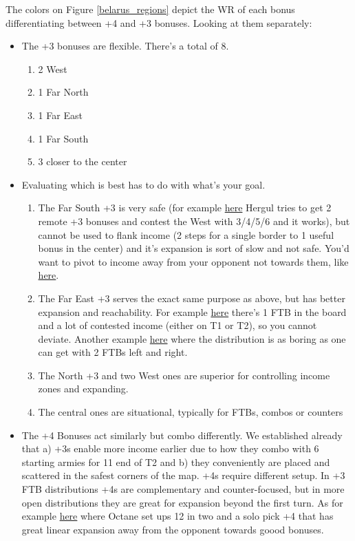 The colors on Figure \ref{belarus_regions} depict the WR of each bonus differentiating between +4 and +3 bonuses. Looking at them separately:
\begin{itemize}
    \item The +3 bonuses are flexible. There's a total of 8.
    \begin{enumerate}
        \item 2 West
        \item 1 Far North
        \item 1 Far East
        \item 1 Far South
        \item 3 closer to the center
    \end{enumerate}
    \item Evaluating which is best has to do with what's your goal.
    \begin{enumerate}
        \item The Far South +3 is very safe (for example \href{https://www.warzone.com/MultiPlayer?GameID=36672825}{here} Hergul tries to get 2 remote +3 bonuses and contest the West with 3/4/5/6 and it works), but cannot be used to flank income (2 steps for a single border to 1 useful bonus in the center) and it's expansion is sort of slow and not safe. You'd want to pivot to income away from your opponent not towards them, like \href{https://www.warzone.com/MultiPlayer?GameID=36792398}{here}.
        \item The Far East +3 serves the exact same purpose as above, but has better expansion and reachability. For example \href{https://www.warzone.com/MultiPlayer?GameID=32481090}{here} there's 1 FTB in the board and a lot of contested income (either on T1 or T2), so you cannot deviate. Another example \href{https://www.warzone.com/MultiPlayer?GameID=32247185}{here} where the distribution is as boring as one can get with 2 FTBs left and right.
        \item The North +3 and two West ones are superior for controlling income zones and expanding.
        \item The central ones are situational, typically for FTBs, combos or counters
    \end{enumerate}
    \item The +4 Bonuses act similarly but combo differently. We established already that a) +3s enable more income earlier due to how they combo with 6 starting armies for 11 end of T2 and b) they conveniently are placed and scattered in the safest corners of the map. +4s require different setup. In +3 FTB distributions +4s are complementary and counter-focused, but in more open distributions they are great for expansion beyond the first turn. As for example \href{https://www.warzone.com/MultiPlayer?GameID=30166708}{here} where Octane set ups 12 in two and a solo pick +4 that has great linear expansion away from the opponent towards goood bonuses. 
\end{itemize}




